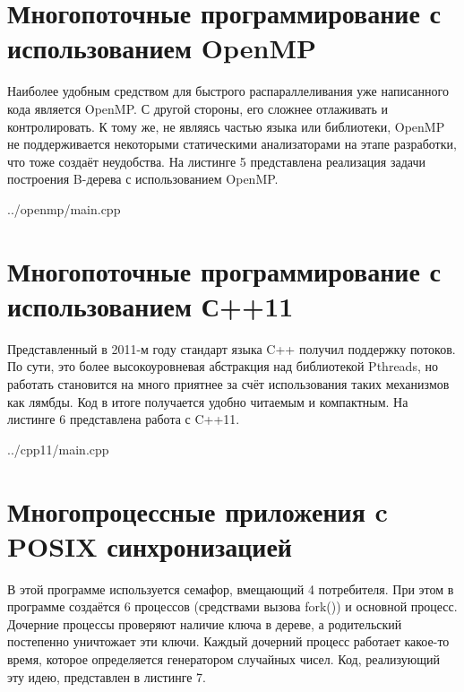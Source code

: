 \documentclass[a4paper, 12pt]{report}		%
\begin{document}
\chapter*{Многопоточные программирование с использованием OpenMP}

Наиболее удобным средством для быстрого распараллеливания уже написанного кода является OpenMP. С другой стороны, его сложнее отлаживать и контролировать. К тому же, не являясь частью языка или библиотеки, OpenMP не поддерживается некоторыми статическими анализаторами на этапе разработки, что тоже создаёт неудобства. На листинге 5 представлена реализация задачи построения B-дерева с использованием OpenMP.


{../openmp/main.cpp}


\chapter*{Многопоточные программирование с использованием С++11}

Представленный в 2011-м году стандарт языка C++ получил поддержку потоков. По сути, это более высокоуровневая абстракция над библиотекой Pthreads, но работать становится на много приятнее за счёт использования таких механизмов как лямбды. Код в итоге получается удобно читаемым и компактным. На листинге 6 представлена работа с C++11.


{../cpp11/main.cpp}


\chapter*{Многопроцессные приложения c POSIX синхронизацией}

В этой программе используется семафор, вмещающий 4 потребителя. При этом в программе создаётся 6 процессов (средствами вызова fork()) и основной процесс. Дочерние процессы проверяют наличие ключа в дереве, а родительский постепенно уничтожает эти ключи. Каждый дочерний процесс работает какое-то время, которое определяется генератором случайных чисел. Код, реализующий эту идею, представлен в листинге 7.
\end{document}
